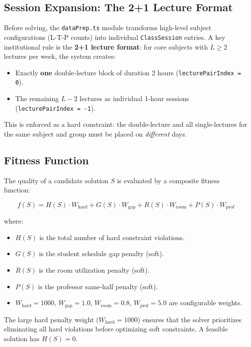 \subsection{Session Expansion: The 2+1 Lecture Format}

Before solving, the \texttt{dataPrep.ts} module transforms high-level subject configurations (L-T-P counts) into individual \texttt{ClassSession} entries. A key institutional rule is the \textbf{2+1 lecture format}: for core subjects with $L \geq 2$ lectures per week, the system creates:
\begin{itemize}
    \item Exactly \textbf{one} double-lecture block of duration 2 hours (\texttt{lecturePairIndex = 0}).
    \item The remaining $L - 2$ lectures as individual 1-hour sessions (\texttt{lecturePairIndex = -1}).
\end{itemize}

This is enforced as a hard constraint: the double-lecture and all single-lectures for the same subject and group must be placed on \emph{different} days.

\subsection{Fitness Function}

The quality of a candidate solution $S$ is evaluated by a composite fitness function:

\begin{equation}
    f(S) = H(S) \cdot W_{\text{hard}} + G(S) \cdot W_{\text{gap}} + R(S) \cdot W_{\text{room}} + P(S) \cdot W_{\text{prof}}
\end{equation}

\noindent where:
\begin{itemize}
    \item $H(S)$ is the total number of hard constraint violations.
    \item $G(S)$ is the student schedule gap penalty (soft).
    \item $R(S)$ is the room utilization penalty (soft).
    \item $P(S)$ is the professor same-half penalty (soft).
    \item $W_{\text{hard}} = 1000$, $W_{\text{gap}} = 1.0$, $W_{\text{room}} = 0.8$, $W_{\text{prof}} = 5.0$ are configurable weights.
\end{itemize}

The large hard penalty weight ($W_{\text{hard}} = 1000$) ensures that the solver prioritizes eliminating all hard violations before optimizing soft constraints. A feasible solution has $H(S) = 0$.

